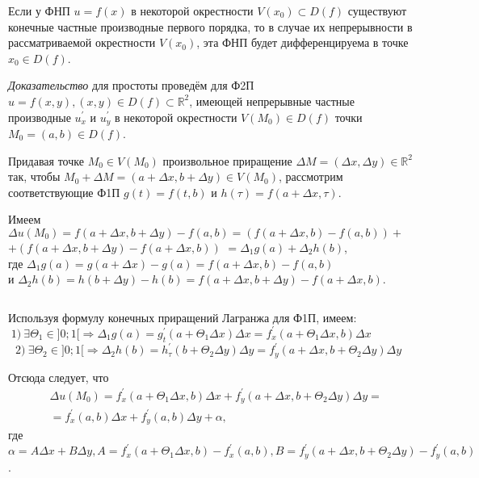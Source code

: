 \begin{theorem}
    $  $
    
	Если у ФНП $u = f(x)$ в некоторой окрестности $V(x_0) \subset D(f)$ существуют конечные частные производные первого порядка, то в случае их непрерывности в рассматриваемой окрестности $V(x_0)$, эта ФНП будет дифференцируема в точке $x_0 \in D(f)$.
\end{theorem}

\textit{Доказательство} для простоты проведём для Ф2П $u = f(x,y), (x,y) \in D(f) \subset \mathbb{R}^2$, имеющей непрерывные частные производные $u_x^{'}$ и $u_y^{'}$ в некоторой окрестности $V(M_0) \in D(f)$ точки $M_0 = (a, b) \in D(f)$. 

Придавая точке $M_0 \in V(M_0)$ произвольное приращение $\Delta M = (\Delta x, \Delta y) \in \mathbb{R}^2$ так, чтобы $M_0 + \Delta M = (a + \Delta x, b + \Delta y) \in V(M_0)$, рассмотрим соответствующие Ф1П $g(t) = f(t, b)$ и $h(\tau) = f(a + \Delta x, \tau)$. 

Имеем
$\Delta u (M_0) = f(a + \Delta x, b + \Delta y) - f(a, b) = \left(f(a + \Delta x, b) - f(a, b) \right) +$ \\
$+ \left(f(a + \Delta x, b+\Delta y) - f(a + \Delta x, b) \right) $ %
$= \Delta_1 g(a) + \Delta_2 h(b)$, \\
где $\Delta_1 g(a) = g(a+\Delta x) - g(a) = f(a+\Delta x, b) - f(a, b)$\\ и $\Delta_2 h(b) = h(b+\Delta y) - h(b) =  f(a + \Delta x, b + \Delta y) - f(a + \Delta x, b)$. 

$  $

Используя формулу конечных приращений Лагранжа для Ф1П, имеем:
\begin{equation}
\label{39}
1) \ \exists \Theta_1 \in ]0;1[ \Rightarrow \Delta_1 g(a) = g_t^{'}(a+\Theta_1 \Delta x) \Delta x = f_x^{'}(a + \Theta_1 \Delta x, b)\Delta x
\;\;\;\;\;\;\;\;\;\;\;\;\;
\end{equation}
\begin{equation}
\label{310}
2) \ \exists \Theta_2 \in ]0;1[ \Rightarrow \Delta_2 h(b) = h_\tau^{'}(b+\Theta_2 \Delta y) \Delta y = f_y^{'}(a + \Delta x, b + \Theta_2 \Delta y)\Delta y
\; \;
\end{equation}

Отсюда следует, что 
\begin{equation}
\label{311}
\begin{split}
& \Delta u(M_0) = f_x^{'}(a + \Theta_1 \Delta x, b)\Delta x + f_y^{'}(a + \Delta x, b + \Theta_2 \Delta y) \Delta y = \\
& = f_x^{'}(a, b)\Delta x + f_y^{'}(a, b)\Delta y + \alpha,
\end{split}
\end{equation}
где $\alpha = A \Delta x + B \Delta y, A = f_x^{'}(a + \Theta_1 \Delta x, b) - f_x^{'}(a, b), B = f_y^{'}(a + \Delta x, b + \Theta_2 \Delta y) - f_y^{'}(a, b)$.

